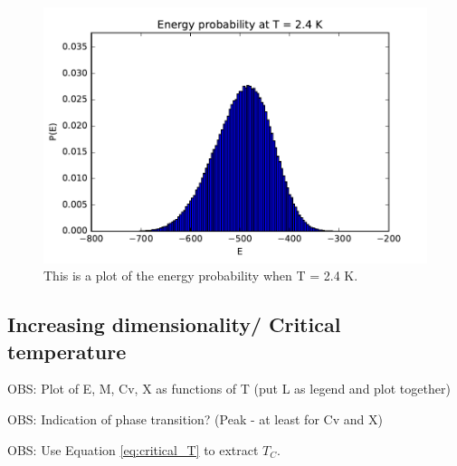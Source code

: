 \begin{figure}[H]
\includegraphics[width=\linewidth]{../results/4d/d_T_2_4probability}\caption{This is a plot of the energy probability when T = 2.4 K.}\label{fig:probability_T_2.4}
\end{figure}

\subsection{Increasing dimensionality/ Critical temperature}

OBS: Plot of E, M, Cv, X as functions of T (put L as legend and plot together)

OBS: Indication of phase transition? (Peak - at least for Cv and X)

OBS: Use Equation \ref{eq:critical_T} to extract $T_C$.